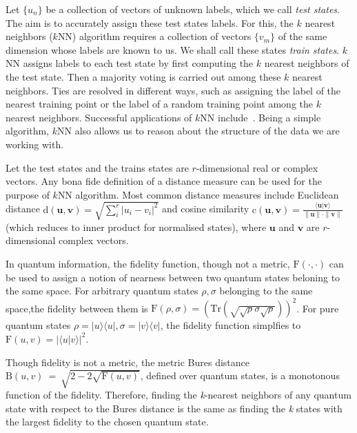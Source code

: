\documentclass[a4paper,twocolumn,11pt,unpublished]{quantumarticle}
\newcommand{\rang}{\rangle}
\newcommand{\lang}{\langle}
\begin{document}
        Let $\{u_n\}$ be a collection of vectors of unknown labels, which we call \textit{test states}. The aim is to accurately assign these test states labels. For this, the $k$ nearest neighbors ($k$NN) algorithm requires a collection of vectors $\{v_m\}$ of the same dimension whose labels are known to us. We shall call these states \textit{train states}. $k$NN assigns labels to each test state by first computing the $k$ nearest neighbors of the test state. Then a majority voting is carried out among these $k$ nearest neighbors. Ties are resolved in different ways, such as assigning the label of the nearest training point or the label of a random training point among the $k$ nearest neighbors. Successful applications of $k$NN include~\cite{Liao2002, Zhang2003}. Being a simple algorithm, $k$NN also allows us to reason about the structure of the data we are working with. 
                
         Let the test states and the trains states are $r$-dimensional real or complex vectors. Any bona fide definition of a distance measure can be used for the purpose of $k$NN algorithm. Most common distance measures include Euclidean distance $\text{d}(\textbf{u},\textbf{v})=\sqrt{\sum_{i}^r|u_i - v_i|^2}$ and cosine similarity $\text{c}(\textbf{u},\textbf{v})=\frac{\lang \textbf{u}|\textbf{v}\rang}{\|\textbf{u}\| \cdot \|\textbf{v}\|}$ (which reduces to inner product for normalised states), where $\textbf{u}$ and $\textbf{v}$ are $r$-dimensional complex vectors.
     
         In quantum information, the fidelity function, though not a metric, $\text{F}(\cdot,\cdot)$ can be used to assign a notion of nearness between two quantum states beloning to the same space. For arbitrary quantum states $\rho, \sigma$ belonging to the same space,the fidelity between them is $\text{F}(\rho,\sigma)  = \left(\text{Tr}\left(\sqrt{\sqrt{\rho}\sigma \sqrt{\rho}}\right)\right)^2$. For pure quantum states $\rho = |u\rang \lang u |, \sigma = |v\rang \lang v |$, the fidelity function simplfies to $\text{F}(u,v) = |\lang u|v\rang|^2$.
         
        Though fidelity is not a metric, the metric Bures distance $\text{B}(u,v)~=~\sqrt{2 - 2\sqrt{\text{F}(u,v)}}$, defined over quantum states, is a monotonous function of the fidelity. Therefore, finding the \textit{k}-nearest neighbors of any quantum state with respect to the Bures distance is the same as finding the \textit{k} states with the largest fidelity to the chosen quantum state.
        
\end{document}
